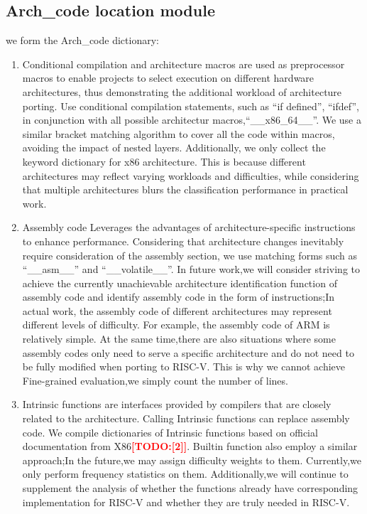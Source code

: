 \documentclass[sigconf,screen,review]{acmart}
\newcommand{\todo}[1]{\textcolor{red}{\textbf{[TODO:#1]}}}
\begin{document}
\subsection{Arch\_code location module}
we form the Arch\_code dictionary:
\begin{enumerate}
  \item Conditional compilation and architecture macros are used as preprocessor macros to enable projects to select execution on different hardware architectures, thus demonstrating the additional workload of architecture porting.
  Use conditional compilation statements, such as ``if defined'', ``ifdef'', in conjunction with all possible architectur macros,``\_\_x86\_64\_\_''.
  We use a similar bracket matching algorithm to cover all the code within macros, avoiding the impact of nested layers.
  Additionally, we only collect the keyword dictionary for x86 architecture.
  This is because different architectures may reflect varying workloads and difficulties, while considering that multiple architectures blurs the classification performance in practical work.
  \item Assembly code Leverages the advantages of architecture-specific instructions to enhance performance.
  Considering that architecture changes inevitably require consideration of the assembly section, we use matching forms such as ``\_\_asm\_\_'' and ``\_\_volatile\_\_''.
  In future work,we will consider striving to achieve the currently unachievable architecture identification function of assembly code and identify assembly code in the form of instructions;In actual work, the assembly code of different architectures may represent different levels of difficulty.
  For example, the assembly code of ARM is relatively simple.
  At the same time,there are also situations where some assembly codes only need to serve a specific architecture and do not need to be fully modified when porting to RISC-V.
  This is why we cannot achieve Fine-grained evaluation,we simply count the number of lines.
  \item Intrinsic functions are interfaces provided by compilers that are closely related to the architecture.
  Calling Intrinsic functions can replace assembly code.
  We compile dictionaries of Intrinsic functions based on official documentation from X86\todo{[2]}.
  Builtin function also employ a similar approach;In the future,we may assign difficulty weights to them.
  Currently,we only perform frequency statistics on them.
  Additionally,we will continue to supplement the analysis of whether the functions already have corresponding implementation for RISC-V and whether they are truly needed in RISC-V.

\end{enumerate}
\end{document}
